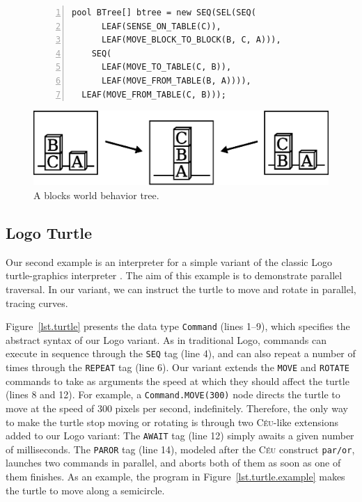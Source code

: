 \documentclass{sig-alternate}
\newcommand{\CEU}{\textsc{C\'{e}u}\xspace}
\newcommand{\code}[1] {{\small{\texttt{#1}}}}
\begin{document}
\begin{figure}[t]
\begin{lstlisting}[numbers=left,xleftmargin=3em]
pool BTree[] btree = new SEQ(SEL(SEQ(
      LEAF(SENSE_ON_TABLE(C)),
      LEAF(MOVE_BLOCK_TO_BLOCK(B, C, A))),
    SEQ(
      LEAF(MOVE_TO_TABLE(C, B)),
      LEAF(MOVE_FROM_TABLE(B, A)))),
  LEAF(MOVE_FROM_TABLE(C, B)));
\end{lstlisting}

\centerline{\includegraphics[scale=0.35]{blocksworld2.eps}}
\caption{ A blocks world behavior tree.
\label{lst.bt1.example}
}
\end{figure}

\subsection{Logo Turtle}

Our second example is an interpreter for a simple variant of the classic Logo
turtle-graphics interpreter \cite{papert.logo}.
The aim of this example is to demonstrate parallel traversal.
In our variant, we can instruct the turtle to move and rotate in parallel, 
tracing curves.


Figure~\ref{lst.turtle} presents the data type \code{Command} (lines 1--9), 
which specifies the abstract syntax of our Logo variant.
As in traditional Logo, commands can execute in sequence through the \code{SEQ} 
tag (line 4), and can also repeat a number of times through the \code{REPEAT} 
tag (line 6).
%
Our variant extends the \code{MOVE} and \code{ROTATE} commands to take as 
arguments the speed at which they should affect the turtle (lines 8 and 12).
For example, a \code{Command.MOVE(300)} node directs the turtle to move at the 
speed of 300 pixels per second, indefinitely.
%
Therefore, the only way to make the turtle stop moving or rotating is through 
two \CEU-like extensions added to our Logo variant:
The \code{AWAIT} tag (line 12) simply awaits a given number of milliseconds.
The \code{PAROR} tag (line 14), modeled after the \CEU construct \code{par/or},
launches two commands in parallel, and aborts both of them as soon as one of
them finishes.
%
As an example, the program in Figure~\ref{lst.turtle.example} makes the turtle 
to move along a semicircle.
\end{document}
